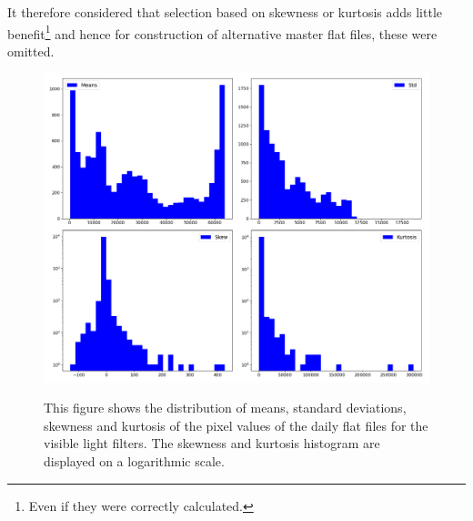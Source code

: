 It therefore considered that selection based on skewness or kurtosis adds little
benefit\footnote{Even if they were correctly calculated.} and hence for
construction of alternative master flat files, these were omitted.

\begin{figure}[!htbp]
\begin{center}
\includegraphics[scale=0.4]{images/flatdispall.png}
\end{center}   
\caption{This figure shows the distribution of means, standard deviations,
skewness and kurtosis of the pixel values of the daily flat files for the
visible light filters. The skewness and kurtosis histogram are displayed on a
logarithmic scale.} \protect\label{fig:flatdispall}
\end{figure}

